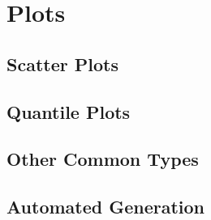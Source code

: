 \section{Plots}

\subsection{Scatter Plots}

\subsection{Quantile Plots}

\subsection{Other Common Types}

\subsection{Automated Generation}

